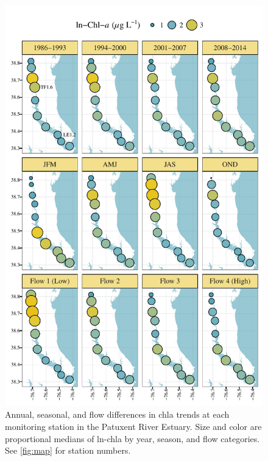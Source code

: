 \documentclass[letterpaper,12pt,oneside]{article}\usepackage[]{graphicx}\usepackage[]{color}
\makeatletter
\def\maxwidth{ %
  \ifdim\Gin@nat@width>\linewidth
    \linewidth
  \else
    \Gin@nat@width
  \fi
}
\makeatother
\begin{document}
\begin{figure}[!ht]

{\centering \includegraphics[width=\maxwidth]{figs/chlyrmofl-1} 

}

\caption{Annual, seasonal, and flow differences in \ac{chla} trends at each monitoring station in the Patuxent River Estuary.  Size and color are proportional medians of ln-\ac{chla} by year, season, and flow categories. See \cref{fig:map} for station numbers.}\label{fig:chlyrmofl}
\end{figure}



\end{document}
